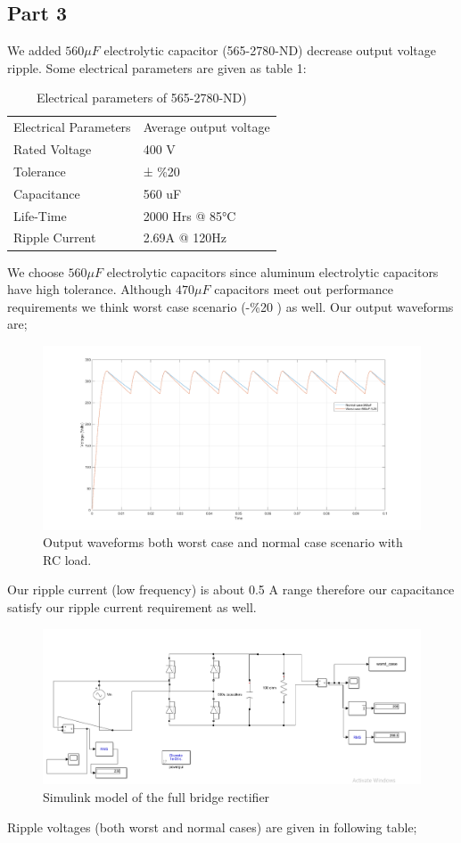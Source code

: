 \documentclass[fleqn, a4paper]{article}
\begin{document}
\subsection*{Part 3}
We added $560 \mu F $ electrolytic capacitor (565-2780-ND) decrease output voltage ripple. Some electrical parameters are given as table 1:
\begin{table}[H]
\centering
\begin{tabular}{ll}
Electrical Parameters & Average output voltage \\
Rated Voltage         & 400 V                  \\
Tolerance             & ± \%20                 \\
Capacitance           & 560 uF                 \\
Life-Time             & 2000 Hrs @ 85°C        \\
Ripple Current        & 2.69A @ 120Hz         
\end{tabular}
\caption{Electrical parameters of 565-2780-ND)}
\end{table}
We choose $560 \mu F $ electrolytic capacitors since aluminum electrolytic capacitors have high tolerance. Although $470 \mu F $ capacitors meet out performance requirements we think worst case scenario (-\%20 ) as well. Our output waveforms are;
\begin{figure}[H]
  \includegraphics[width=\linewidth]{RC_load.png}
  \caption{Output waveforms both worst case and normal case scenario with RC load.}
  \label{fig:simulink2}
\end{figure}
Our ripple current (low frequency) is about 0.5 A range therefore our capacitance satisfy our ripple current requirement as well. 

\begin{figure}[H]
  \includegraphics[width=\linewidth]{Simulink_modelRC_load.PNG}
  \caption{Simulink model of the full bridge rectifier}
  \label{fig:simulink3}
\end{figure}
Ripple voltages (both worst and normal cases) are given in following table;
\end{document}
